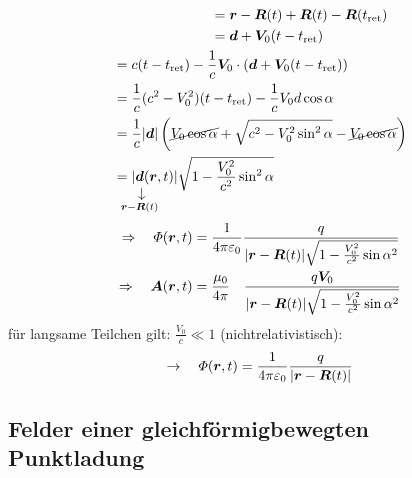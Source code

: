 \begin{enumerate}[i)]
\begin{align*}
	& \quad \qquad \qquad \qquad = \vec{r} - \vec{R}(t) + \vec{R}(t) - \vec{R}(t_{\tx{ret}}) \\
	& \quad \qquad \qquad \qquad = \vec{d} + \vec{V}_0 (t - t_{\tx{ret}})\\
	&= c(t - t_{\tx{ret}}) - \frac{1}{c} \vec{V}_0 \cdot (\vec{d} + \vec{V}_0 (t - t_{\tx{ret}}))\\
	&= \frac{1}{c} (c^2 - V_0^2) (t - t_{\tx{ret}}) - \frac{1}{c} V_0 d \cos \alpha\\
	&= \frac{1}{c} |\vec{d}| \left(\cancel{ V_0 \cos \alpha} + \sqrt{c^2 - V_0^2 \sin^2 \alpha} - \cancel{ V_0 \cos \alpha}\right)\\
	&= |\custo{\rightarrow}{\vec{d}}{\mathclap{\vec{r} - \vec{R}(t)}}(\vec{r},t)| \sqrt{1 - \frac{V_0^2}{c^2} \sin^2 \alpha}
	\end{align*}
	\begin{align}
	\Rightarrow \quad \Phi(\vec{r},t) &= \kq \frac{q}{|\vec{r} - \vec{R}(t)| \sqrt{1 - \frac{V_0^2}{c^2} \sin \alpha^2}}\\
	\Rightarrow \quad \vec{A}(\vec{r},t) &= \frac{\mu_0}{4 \pi} \ \ \ \frac{q \vec{V}_0}{|\vec{r} - \vec{R}(t)| \sqrt{1 - \frac{V_0^2}{c^2} \sin \alpha^2}}
	\end{align}
	für langsame Teilchen gilt: $ \frac{V_0}{c} \ll 1 $ (nichtrelativistisch):
	\begin{equation*}
	\rightarrow \quad \varPhi(\bm{r},t) = \frac{1}{4\pi\varepsilon_0} \frac{q}{|\bm{r} - \bm{R}(t)|}
	\end{equation*}
\end{enumerate}

\subsection{Felder einer gleichförmigbewegten Punktladung}

